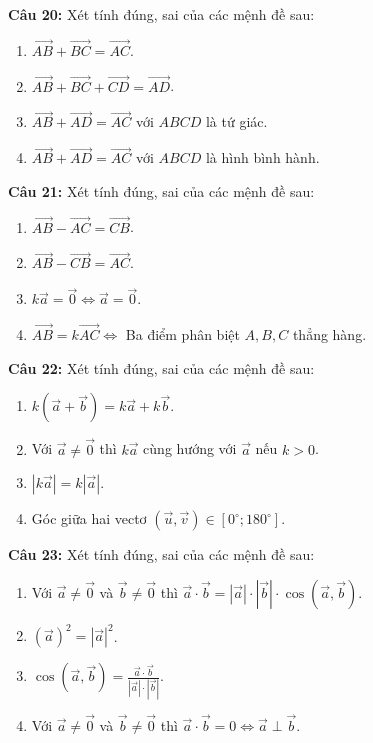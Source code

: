 \documentclass[12pt]{article}
\begin{document}
	\vspace{0.2cm}
	\noindent \textbf{Câu 20:} Xét tính đúng, sai của các mệnh đề sau:
	\begin{enumerate}[label=\alph*)]
		\item $\overrightarrow{AB} + \overrightarrow{BC} = \overrightarrow{AC}$.
		\item $\overrightarrow{AB} + \overrightarrow{BC} + \overrightarrow{CD} = \overrightarrow{AD}$.
		\item $\overrightarrow{AB} + \overrightarrow{AD} = \overrightarrow{AC}$ với $ABCD$ là tứ giác.
		\item $\overrightarrow{AB} + \overrightarrow{AD} = \overrightarrow{AC}$ với $ABCD$ là hình bình hành.
	\end{enumerate}
	
	\vspace{0.2cm}
	\noindent \textbf{Câu 21:} Xét tính đúng, sai của các mệnh đề sau:
	\begin{enumerate}[label=\alph*)]
		\item $\overrightarrow{AB} - \overrightarrow{AC} = \overrightarrow{CB}$.
		\item $\overrightarrow{AB} - \overrightarrow{CB} = \overrightarrow{AC}$.
		\item $k\vec{a} = \vec{0} \Leftrightarrow \vec{a} = \vec{0}$.
		\item $\overrightarrow{AB} = k\overrightarrow{AC} \Leftrightarrow$ Ba điểm phân biệt $A, B, C$ thẳng hàng.
	\end{enumerate}
	
	\vspace{0.2cm}
	\noindent \textbf{Câu 22:} Xét tính đúng, sai của các mệnh đề sau:
	\begin{enumerate}[label=\alph*)]
		\item $k(\vec{a} + \vec{b}) = k\vec{a} + k\vec{b}$.
		\item Với $\vec{a} \neq \vec{0}$ thì $k\vec{a}$ cùng hướng với $\vec{a}$ nếu $k > 0$.
		\item $|k\vec{a}| = k|\vec{a}|$.
		\item Góc giữa hai vectơ $(\vec{u}, \vec{v}) \in [0^\circ; 180^\circ]$.
	\end{enumerate}
	
	\vspace{0.2cm}
	\noindent \textbf{Câu 23:} Xét tính đúng, sai của các mệnh đề sau:
	\begin{enumerate}[label=\alph*)]
		\item Với $\vec{a} \neq \vec{0}$ và $\vec{b} \neq \vec{0}$ thì $\vec{a} \cdot \vec{b} = |\vec{a}| \cdot |\vec{b}| \cdot \cos(\vec{a}, \vec{b})$.
		\item $(\vec{a})^2 = |\vec{a}|^2$.
		\item $\cos(\vec{a}, \vec{b}) = \frac{\vec{a} \cdot \vec{b}}{|\vec{a}| \cdot |\vec{b}|}$.
		\item Với $\vec{a} \neq \vec{0}$ và $\vec{b} \neq \vec{0}$ thì $\vec{a} \cdot \vec{b} = 0 \Leftrightarrow \vec{a} \perp \vec{b}$.
	\end{enumerate}
	
\end{document}
